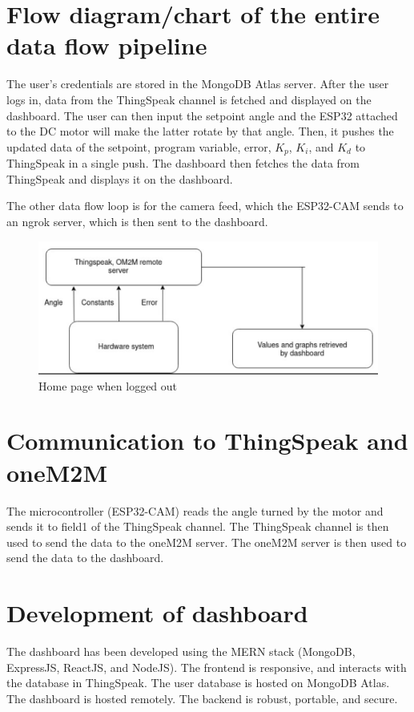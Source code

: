 \documentclass[12pt, a4paper]{article}
\theoremstyle{definition}
\theoremstyle{remark}
\begin{document}
\section{Flow diagram/chart of the entire data flow pipeline}
The user's credentials are stored in the MongoDB Atlas server. After the user logs in, data from the ThingSpeak channel is fetched and displayed on the dashboard. The user can then input the setpoint angle and the ESP32 attached to the DC motor will make the latter rotate by that angle. Then, it pushes the updated data of the setpoint, program variable, error, $K_p$, $K_i$, and $K_d$ to ThingSpeak in a single push. The dashboard then fetches the data from ThingSpeak and displays it on the dashboard.

The other data flow loop is for the camera feed, which the ESP32-CAM sends to an ngrok server, which is then sent to the dashboard.

\begin{figure}[!h]
    \centering
    \includegraphics[scale=0.4]{img/dataflow.png}
    \caption{Home page when logged out}
    \label{fig:dataflow}
\end{figure}

\section{Communication to ThingSpeak and oneM2M}
The microcontroller (ESP32-CAM) reads the angle turned by the motor and sends it to field1 of the ThingSpeak channel. The ThingSpeak channel is then used to send the data to the oneM2M server. The oneM2M server is then used to send the data to the dashboard.

\section{Development of dashboard}
The dashboard has been developed using the MERN stack (MongoDB, ExpressJS, ReactJS, and NodeJS). The frontend is responsive, and interacts with the database in ThingSpeak. The user database is hosted on MongoDB Atlas. The dashboard is hosted remotely. The backend is robust, portable, and secure.
\end{document}
